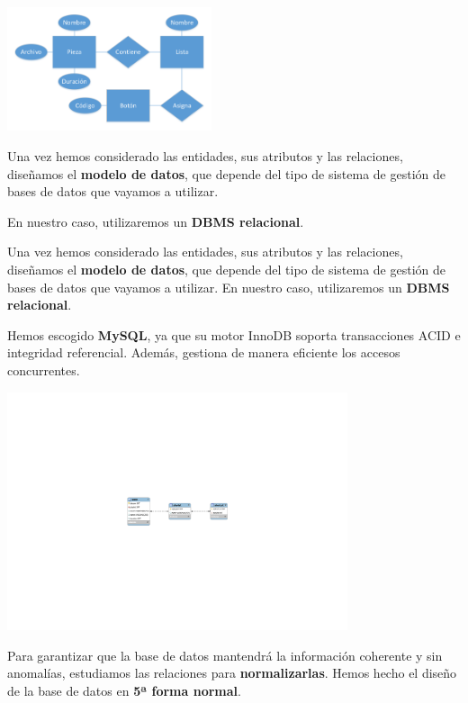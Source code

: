 \documentclass[10pt,a4paper]{article}
\begin{document}
	\begin{multicols}{2}
		\noindent
		\begin{center}
			\includegraphics[width=0.45\textwidth]{images/bd_er} 
		\end{center}
		\columnbreak
		Una vez hemos considerado las entidades, sus atributos y las relaciones, diseñamos el \textbf{modelo de datos}, que depende del tipo de sistema de gestión de bases de datos que vayamos a utilizar.
		
		En nuestro caso, utilizaremos un \textbf{DBMS relacional}.
	\end{multicols}
	
	Una vez hemos considerado las entidades, sus atributos y las relaciones, diseñamos el \textbf{modelo de datos}, que depende del tipo de sistema de gestión de bases de datos que vayamos a utilizar. En nuestro caso, utilizaremos un \textbf{DBMS relacional}.
	
	Hemos escogido \textbf{MySQL}, ya que su motor InnoDB soporta transacciones ACID e integridad referencial. Además, gestiona de manera eficiente los accesos concurrentes.
	
	\begin{center}
		\includegraphics[width=0.75\textwidth]{images/bd_rel} 
	\end{center}
	
	Para garantizar que la base de datos mantendrá la información coherente y sin anomalías, estudiamos las relaciones para \textbf{normalizarlas}. Hemos hecho el diseño de la base de datos en \textbf{5ª forma normal}.
	
\end{document}
